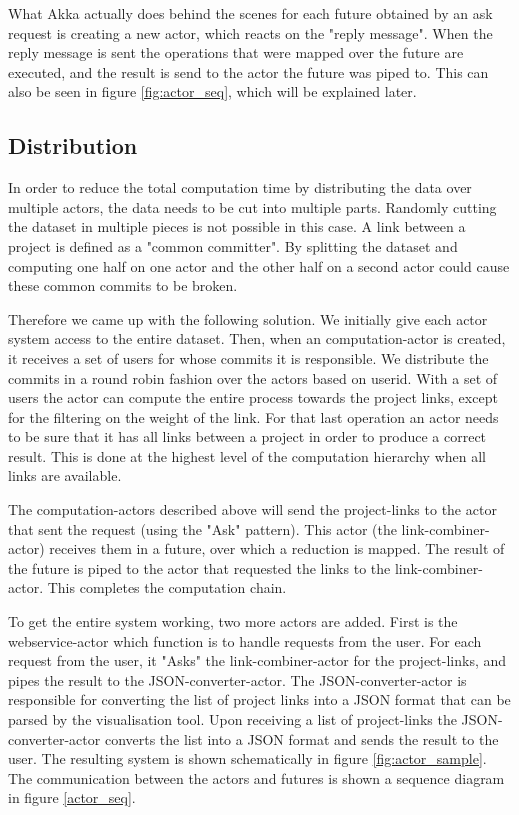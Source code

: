 \documentclass[10pt,a4paper]{article}
\begin{document}
What Akka actually does behind the scenes for each future obtained by an ask request is creating a new actor, which reacts on the "reply message". When the reply message is sent the operations that were mapped over the future are executed, and the result is send to the actor the future was piped to. This can also be seen in figure \ref{fig:actor_seq}, which will be explained later.

\subsection{Distribution}

In order to reduce the total computation time by distributing the data over multiple actors, the data needs to be cut into multiple parts. Randomly cutting the dataset in multiple pieces is not possible in this case. A link between a project is defined as a "common committer". By splitting the dataset and computing one half on one actor and the other half on a second actor could cause these common commits to be broken. 

Therefore we came up with the following solution. We initially give each actor system access to the entire dataset. Then, when an computation-actor is created, it receives a set of users for whose commits it is responsible. We distribute the commits in a round robin fashion over the actors based on userid. With a set of users the actor can compute the entire process towards the project links, except for the filtering on the weight of the link. For that last operation an actor needs to be sure that it has all links between a project in order to produce a correct result. This is done at the highest level of the computation hierarchy when all links are available.

The computation-actors described above will send the project-links to the actor that sent the request (using the "Ask" pattern). This actor (the link-combiner-actor) receives them in a future, over which a reduction is mapped. The result of the future is piped to the actor that requested the links to the link-combiner-actor. This completes the computation chain.

To get the entire system working, two more actors are added. First is the webservice-actor which function is to handle requests from the user. For each request from the user, it "Asks" the link-combiner-actor for the project-links, and pipes the result to the JSON-converter-actor. The JSON-converter-actor is responsible for converting the list of  project links into a JSON format that can be parsed by the visualisation tool. Upon receiving a list of project-links the JSON-converter-actor converts the list into a JSON format and sends the result to the user. The resulting system is shown schematically in figure \ref{fig:actor_sample}. The communication between the actors and futures is shown a sequence diagram in figure \ref{actor_seq}.
\end{document}
